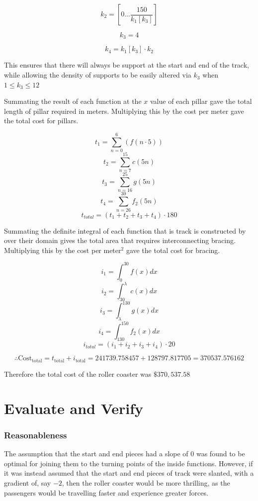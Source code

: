 \documentclass[11pt, letterpaper]{article}
\begin{document}
$$k_{2}=\left[0...\frac{150}{k_{1}\left[k_{3}\right]}\right]$$

$$k_{3}=4$$

$$k_{4}=k_{1}\left[k_{3}\right]\cdot k_{2}$$

This ensures that there will always be support at the start and end of the track, while allowing the density of supports to be easily altered via $k_3$ when $1\leq k_3\leq12$

Summating the result of each function at the $x$ value of each pillar gave the total length of pillar required in meters. Multiplying this by the cost per meter gave the total cost for pillars.



$$t_{1}=\sum_{n=0}^{6}\left(f\left(n\cdot5\right)\right)$$
$$t_{2}=\sum_{n=7}^{15}c\left(5n\right)$$
$$t_{3}=\sum_{n=16}^{25}g\left(5n\right)$$
$$t_{4}=\sum_{n=26}^{30}f_{2}\left(5n\right)$$
$$t_{total}=\left(t_{1}+t_{2}+t_{3}+t_{4}\right)\cdot180$$

Summating the definite integral of each function that is track is constructed by over their domain gives the total area that requires interconnecting bracing. Multiplying this by the cost per meter$^2$ gave the total cost for bracing.

$$i_{1}=\int_{0}^{30}f\left(x\right)dx$$
$$i_{2}=\int_{30}^{\lambda}c\left(x\right)dx$$
$$i_{3}=\int_{\lambda}^{130}g\left(x\right)dx$$
$$i_{4}=\int_{130}^{150}f_{2}\left(x\right)dx$$
$$i_{total}=\left(i_{1}+i_{2}+i_{3}+i_{4}\right)\cdot20$$


 $$\therefore \textrm{Cost}_{\mathrm{total}}=t_\mathrm{total}+i_\mathrm{total}=241739.758457+128797.817705=370537.576162$$

Therefore the total cost of the roller coaster was $\$370,537.58$
\section{Evaluate and Verify}
\subsubsection{Reasonableness}



The assumption that the start and end pieces had a slope of 0 was found to be optimal for joining them to the turning points of the inside functions. However, if it was instead assumed that the start and end pieces of track were slanted, with a gradient of, say $-2$, then the roller coaster would be more thrilling, as the passengers would be travelling faster and experience greater forces.
\end{document}
